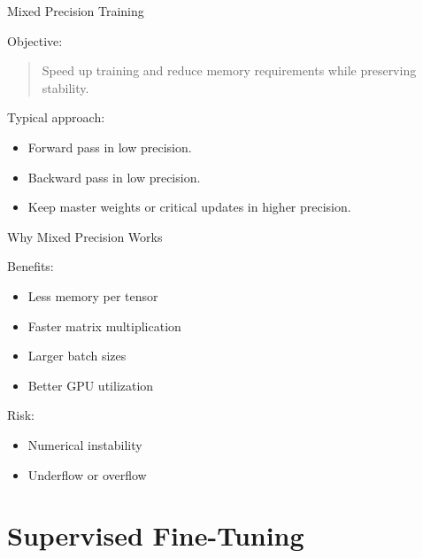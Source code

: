 \documentclass[aspectratio=169]{beamer}
\begin{document}
\begin{frame}{Mixed Precision Training}

Objective:

\begin{quote}
Speed up training and reduce memory requirements while preserving stability.
\end{quote}

\vspace{0.5cm}

Typical approach:

\begin{itemize}
    \item Forward pass in low precision.
    \item Backward pass in low precision.
    \item Keep master weights or critical updates in higher precision.
\end{itemize}

\end{frame}

\begin{frame}{Why Mixed Precision Works}

Benefits:

\begin{itemize}
    \item Less memory per tensor
    \item Faster matrix multiplication
    \item Larger batch sizes
    \item Better GPU utilization
\end{itemize}

\vspace{0.5cm}

Risk:

\begin{itemize}
    \item Numerical instability
    \item Underflow or overflow
\end{itemize}

\end{frame}

\section{Supervised Fine-Tuning}
\end{document}
